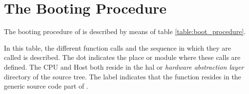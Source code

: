 
%
%

\section{The Booting Procedure}

The booting procedure of \oswald is described by means of
table \ref{table:boot_procedure}. 

In this table, the different function calls and the sequence in which they
are called is described. The dot indicates the place or module where these
calls are defined. The \textsf{CPU} and \textsf{Host} both reside in the
\textsf{hal} or {\em hardware abstraction layer} directory of the \oswald source
tree. The \textsf{\oswald} label indicates that the function resides in the
generic source code part of \oswald.


